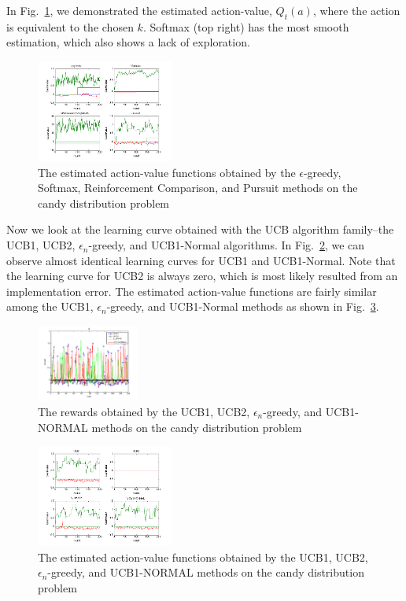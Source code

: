 \documentclass[conference]{IEEEtran}
\begin{document}
In Fig.~\ref{sutton_candy_qr}, we demonstrated the estimated action-value, $Q_t(a)$, where the action is equivalent to the chosen $k$. Softmax (top right) has the most smooth estimation, which also shows a lack of exploration. 

\begin{figure}
	\center	
	\includegraphics[width=0.4\textwidth]{fig/sutton_candy_qr.png}
	\caption{The estimated action-value functions obtained by the $\epsilon$-greedy, Softmax, Reinforcement Comparison, and Pursuit methods on the candy distribution problem}
	\label{sutton_candy_qr}
\end{figure}

Now we look at the learning curve obtained with the UCB algorithm family--the UCB1, UCB2, $\epsilon_n$-greedy, and UCB1-Normal algorithms. In Fig.~\ref{ucb_candy_r}, we can observe almost identical learning curves for UCB1 and UCB1-Normal. Note that the learning curve for UCB2 is always zero, which is most likely resulted from an implementation error. The estimated action-value functions are fairly similar among the UCB1, $\epsilon_n$-greedy, and UCB1-Normal methods as shown in Fig.~\ref{ucb_candy_qr}.

\begin{figure}
	\center	
	\includegraphics[width=0.3\textwidth]{fig/ucb_candy_r.png}
	\caption{The rewards obtained by the UCB1, UCB2, $\epsilon_n$-greedy, and UCB1-NORMAL methods on the candy distribution problem}
	\label{ucb_candy_r}
\end{figure}


\begin{figure}
	\center	
	\includegraphics[width=0.4\textwidth]{fig/ucb_candy_qr.png}
	\caption{The estimated action-value functions obtained by the UCB1, UCB2, $\epsilon_n$-greedy, and UCB1-NORMAL methods on the candy distribution problem}
	\label{ucb_candy_qr}
\end{figure}
\end{document}

